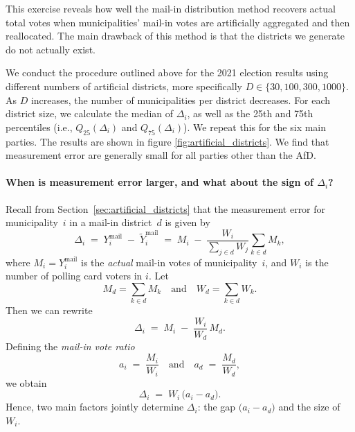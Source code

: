\documentclass[12pt]{article}
\begin{document}
This exercise reveals how well the mail-in distribution method recovers actual total votes when municipalities’ mail-in votes are artificially aggregated and then reallocated. The main drawback of this method is that the districts we generate do not actually exist. 

We conduct the procedure outlined above for the 2021 election results using different numbers of artificial districts, more specifically $D \in \{30, 100, 300, 1000\}$. As $D$ increases, the number of municipalities per district decreases. For each district size, we calculate the median of $\Delta_i$, as well as the 25th and 75th percentiles (i.e., $Q_{25}(\Delta_i)$ and $Q_{75}(\Delta_i)$). We repeat this for the six main parties. The results are shown in figure \ref{fig:artificial_districts}. We find that measurement error are generally small for all parties other than the AfD.



\paragraph{When is measurement error larger, and what about the sign of \(\Delta_i\)?}

Recall from Section~\ref{sec:artificial_districts} that the measurement error for municipality~\(i\) in a mail-in district~\(d\) is given by
\[
    \Delta_i
    \;=\;
    Y_i^{\text{mail}}
    \;-\;
    \widetilde{Y}_i^{\text{mail}}
    \;=\;
    M_i 
    \;-\;
    \frac{W_i}{\sum_{j \in d} W_j} 
    \sum_{k \in d} M_k,
\]
where \(M_i = Y_i^{\text{mail}}\) is the \emph{actual} mail-in votes of municipality~\(i\), and \(W_i\) is the number of polling card voters in \(i\). Let
\[
    M_d = \sum_{k \in d} M_k
    \quad\text{and}\quad
    W_d = \sum_{k \in d} W_k.
\]
Then we can rewrite
\[
    \Delta_i
    \;=\;
    M_i \;-\; \frac{W_i}{W_d}\,M_d.
\]
Defining the \emph{mail-in vote ratio} 
\[
    a_i \;=\; \frac{M_i}{W_i}
    \quad\text{and}\quad
    a_d \;=\; \frac{M_d}{W_d},
\]
we obtain 
\[
    \Delta_i 
    \;=\; 
    W_i \,\bigl(a_i - a_d\bigr).
\]
Hence, two main factors jointly determine \(\Delta_i\): the gap \(\bigl(a_i - a_d\bigr)\) and the size of \(W_i\).
\end{document}

